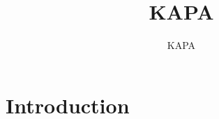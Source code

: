 \documentclass[12pt]{article}
\begin{document}
\title{KAPA}
\author{KAPA}
\maketitle

\section{Introduction}

\end{document}
